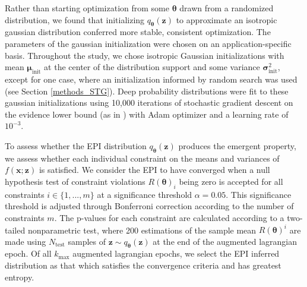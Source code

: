 \documentclass[11pt]{article}
\begin{document}
Rather than starting optimization from some $\bm{\theta}$ drawn from a randomized distribution, we found that initializing $q_{\bm{\theta}}(\mathbf{z})$ to approximate an isotropic gaussian distribution conferred more stable, consistent optimization.  
The parameters of the gaussian initialization were chosen on an application-specific basis.  
Throughout the study, we chose isotropic Gaussian initializations with mean $\bm{\mu}_{\text{init}}$ at the center of the distribution support and some variance $\bm{\sigma}_{\text{init}}^2$, except for one case, where an initialization informed by random search was used (see Section \ref{methods_STG}).
Deep probability distributions were fit to these gaussian initializations using 10,000 iterations of stochastic gradient descent on the evidence lower bound (as in \cite{bittner2019approximating}) with Adam optimizer and a learning rate of $10^{-3}$.

To assess whether the EPI distribution $q_{\bm{\theta}}(\mathbf{z})$ produces the emergent property, we assess whether each individual constraint on the means and variances of $f(\mathbf{x}; \mathbf{z})$ is satisfied.
We consider the EPI to have converged when a null hypothesis test of constraint violations $R(\bm{\theta})_i$ being zero is accepted for all constraints $i \in \{1, ..., m\}$ at a significance threshold $\alpha=0.05$. 
This significance threshold is adjusted through Bonferroni correction according to the number of constraints $m$.  
The p-values for each constraint are calculated according to a two-tailed nonparametric test, where 200 estimations of the sample mean $R(\bm{\theta})^i$ are made using $N_{\text{test}}$ samples of $\mathbf{z} \sim q_{\bm{\theta}}(\mathbf{z})$ at the end of the augmented lagrangian epoch.
Of all $k_{\text{max}}$ augmented lagrangian epochs, we select the EPI inferred distribution as that which satisfies the convergence criteria and has greatest entropy.

\end{document}
